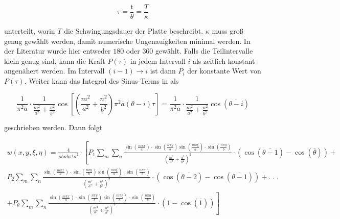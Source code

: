  \begin{equation}
 	\tau = \dfrac{\mbox{t}}{\theta}=\dfrac{T}{\kappa}
 \end{equation}
 
 unterteilt, worin $T$ die Schwingungsdauer der Platte beschreibt. $\kappa$ muss groß genug gewählt werden, damit numerische Ungenauigkeiten minimal werden. In der Literatur wurde hier entweder $180$ oder $360$ gewählt. Falls die Teilintervalle klein genug sind, kann die Kraft $P(\tau	)$ in jedem Intervall $i$ als zeitlich konstant angenähert werden. Im Intervall $(i-1) \rightarrow i$ ist dann $P_{i}$ der konstante Wert von $P(\tau)$. Weiter kann das Integral des Sinus-Terms in  als
 
 \begin{equation}
 	\frac{1}{\pi^2\overline{a}} \cdot \frac{1}{\frac{m^2}{a^2}+\frac{n^2}{b^2}} \cos \left[ \left( \frac{m^2}{a^2}+\frac{n^2}{b^2} \right) \pi^2\overline{a}(\theta - i)\tau\right]= \frac{1}{\pi^2\overline{a}} \cdot \frac{1}{\frac{m^2}{a^2}+\frac{n^2}{b^2}} \cos(\overline{\theta-i})
 	\label{eq:easySinus}
 \end{equation}  

geschrieben werden. Dann folgt

\begin{equation}
\begin{multlined}
	w(x,y,\xi, \eta) = \frac{4}{\rho h a b \pi^4 \overline{a}^2} \cdot \left[ P_{1} \sum_m \sum_n \frac{\sin\left(\frac{m \pi x}{a}\right) \cdot \sin\left(\frac{n \pi y}{b}\right) \sin\left(\frac{m \pi \xi}{a}\right) \cdot \sin\left(\frac{n \pi \eta}{b}\right)	}{ \left( \frac{m^2}{a^2} + \frac{n^2}{b^2} \right)^2} \cdot \left( \cos(\overline{\theta-1}) - \cos(\overline{\theta}) \right) + \right. \\ P_{2} \sum_m \sum_n \frac{\sin\left(\frac{m \pi x}{a}\right) \cdot \sin\left(\frac{n \pi y}{b}\right) \sin\left(\frac{m \pi \xi}{a}\right) \cdot \sin\left(\frac{n \pi \eta}{b}\right)	}{ \left( \frac{m^2}{a^2} + \frac{n^2}{b^2} \right)^2} \cdot \left( \cos(\overline{\theta-2}) - \cos(\overline{\theta-1}) \right) + . \; . \; .\ \\ \left. + P_{\theta} \sum_m \sum_n \frac{\sin\left(\frac{m \pi x}{a}\right) \cdot \sin\left(\frac{n \pi y}{b}\right) \sin\left(\frac{m \pi \xi}{a}\right) \cdot \sin\left(\frac{n \pi \eta}{b}\right)	}{ \left( \frac{m^2}{a^2} + \frac{n^2}{b^2} \right)^2} \cdot \left( 1 - \cos(\overline{1}) \right) \right]
	\label{eq:horror}
\end{multlined}
\end{equation}

